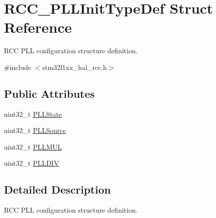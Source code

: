 \hypertarget{struct_r_c_c___p_l_l_init_type_def}{\section{R\-C\-C\-\_\-\-P\-L\-L\-Init\-Type\-Def Struct Reference}
\label{struct_r_c_c___p_l_l_init_type_def}
}


R\-C\-C P\-L\-L configuration structure definition.  




{\ttfamily \#include $<$stm32l1xx\-\_\-hal\-\_\-rcc.\-h$>$}

\subsection*{Public Attributes}
\begin{DoxyCompactItemize}
\item 
uint32\-\_\-t \hyperlink{struct_r_c_c___p_l_l_init_type_def_a6cbaf84f6566af15e6e4f97a339d5759}{P\-L\-L\-State}
\item 
uint32\-\_\-t \hyperlink{struct_r_c_c___p_l_l_init_type_def_a72806832a179af8756b9330de7f7c6a8}{P\-L\-L\-Source}
\item 
uint32\-\_\-t \hyperlink{struct_r_c_c___p_l_l_init_type_def_a351617c365fad2d58aedb7335308044b}{P\-L\-L\-M\-U\-L}
\item 
uint32\-\_\-t \hyperlink{struct_r_c_c___p_l_l_init_type_def_a7b0ad197ffcf75b68f7fa90ce1c99103}{P\-L\-L\-D\-I\-V}
\end{DoxyCompactItemize}


\subsection{Detailed Description}
R\-C\-C P\-L\-L configuration structure definition. 

